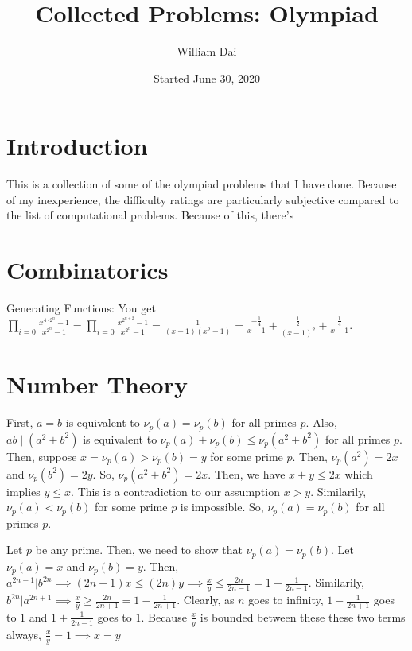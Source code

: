 \documentclass[11pt]{article}
\title{Collected Problems: Olympiad}
\author{William Dai}
\date{Started June 30, 2020}
\begin{document}
\maketitle

\section{Introduction}
This is a collection of some of the olympiad problems that I have done. Because of my inexperience, the difficulty ratings are particularly subjective compared to the list of computational problems. Because of this, there\rq{s}
\section{Combinatorics}

\begin{sol} Generating Functions: You get $\prod_{i=0} \frac{x^{4\cdot 2^{n}}-1}{x^{2^n}-1}= \prod_{i=0} \frac{x^{2^{n+2}}-1}{x^{2^n}-1}=\frac{1}{(x-1)(x^2-1)}=\frac{-\frac{1}{4}}{x-1}+\frac{\frac{1}{2}}{(x-1)^2}+\frac{\frac{1}{4}}{x+1}.$
\end{sol}


\setcounter{problem}{0}
\section{Number Theory}


\begin{sol}
First, $a=b$ is equivalent to $\nu_{p}(a) = \nu_{p}(b)$ for all primes $p$. Also, $ab\mid (a^2+b^2)$ is equivalent to $\nu_{p}(a)+\nu_{p}(b)\leq \nu_{p}(a^2+b^2)$ for all primes $p$. Then, suppose $x=\nu_{p}(a) > \nu_{p}(b)=y$ for some prime $p$. Then, $\nu_{p}(a^2)=2x$ and $\nu_{p}(b^2)=2y$. So, $\nu_{p}(a^2+b^2)=2x$. Then, we have $x+y\leq 2x$ which implies $y\leq x$. This is a contradiction to our assumption $x>y$. Similarily, $\nu_{p}(a)<\nu_{p}(b)$ for some prime $p$ is impossible. So, $\nu_{p}(a)=\nu_{p}(b)$ for all primes $p$.
\end{sol}

\begin{sol}
Let $p$ be any prime. Then, we need to show that $\nu_{p}(a) = \nu_{p}(b)$. Let $\nu_{p}(a)=x$ and $\nu_{p}(b)=y$. Then, $a^{2n-1}|b^{2n}\implies (2n-1)x \leq (2n)y\implies \frac{x}{y} \leq \frac{2n}{2n-1} = 1 + \frac{1}{2n-1}$. Similarily, $b^{2n}|a^{2n+1} \implies \frac{x}{y} \ge \frac{2n}{2n+1} = 1 - \frac{1}{2n+1}$. Clearly, as $n$ goes to infinity, $1-\frac{1}{2n+1}$ goes to $1$ and $1+\frac{1}{2n-1}$ goes to $1$. Because $\frac{x}{y}$ is bounded between these these two terms always, $\frac{x}{y}=1\implies x=y$
\end{sol}
\end{document}
